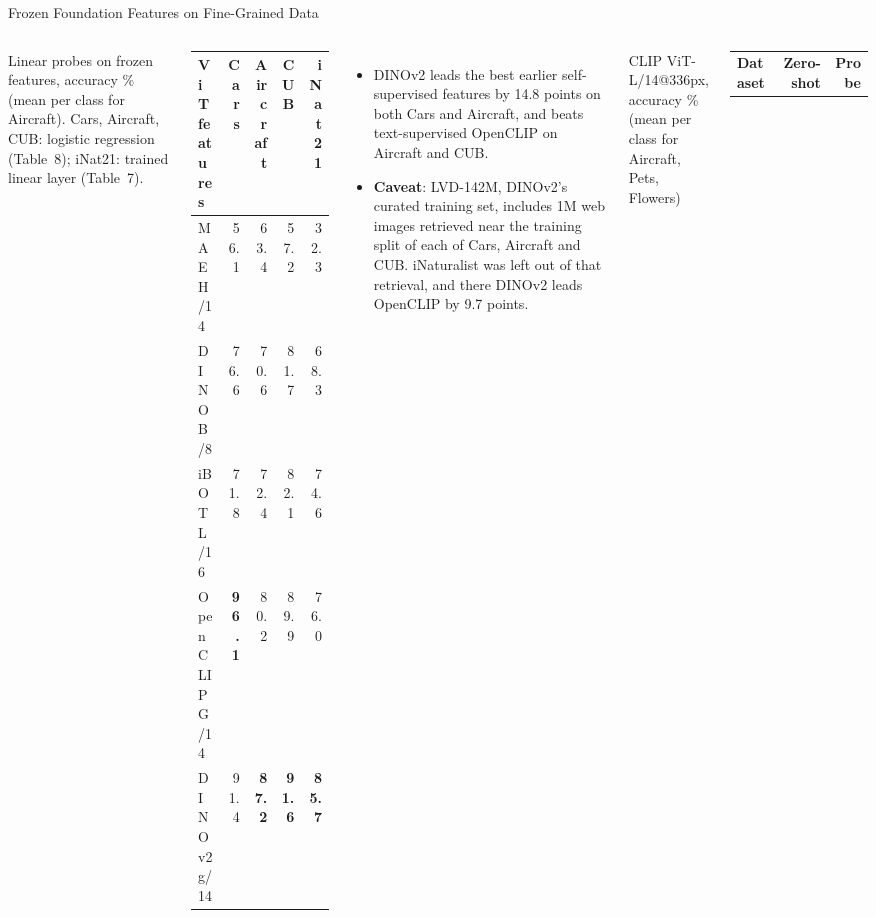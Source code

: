 \begin{frame}{Frozen Foundation Features on Fine-Grained Data}
  \begin{columns}[T,onlytextwidth]
      \centering
      {\scriptsize Linear probes on frozen features, accuracy \% (mean per class for Aircraft). Cars, Aircraft, CUB: logistic regression (Table~8); iNat21: trained linear layer (Table~7).\par}
      \vspace{0.2em}
      {\scriptsize\setlength{\tabcolsep}{4pt}
      \begin{tabular}{l r r r r}
        \toprule
        \textbf{ViT features} & \textbf{Cars} & \textbf{Aircraft} & \textbf{CUB} & \textbf{iNat21} \\
        \midrule
        MAE H/14 & 56.1 & 63.4 & 57.2 & 32.3 \\
        DINO B/8 & 76.6 & 70.6 & 81.7 & 68.3 \\
        iBOT L/16 & 71.8 & 72.4 & 82.1 & 74.6 \\
        OpenCLIP G/14 & \textbf{96.1} & 80.2 & 89.9 & 76.0 \\
        DINOv2 g/14 & 91.4 & \textbf{87.2} & \textbf{91.6} & \textbf{85.7} \\
        \bottomrule
      \end{tabular}\par}
      \vspace{0.3em}
      \begin{itemize}\scriptsize\itemsep0.25em
        \item DINOv2 leads the best earlier self-supervised features by 14.8 points on both Cars and Aircraft, and beats text-supervised OpenCLIP on Aircraft and CUB.
        \item \textbf{Caveat}: LVD-142M, DINOv2's curated training set, includes 1M web images retrieved near the training split of each of Cars, Aircraft and CUB. iNaturalist was left out of that retrieval, and there DINOv2 leads OpenCLIP by 9.7 points.
      \end{itemize}
      \centering
      {\scriptsize CLIP ViT-L/14@336px, accuracy \% (mean per class for Aircraft, Pets, Flowers)\par}
      \vspace{0.2em}
      {\scriptsize\setlength{\tabcolsep}{4pt}
      \begin{tabular}{l r r}
        \toprule
        \textbf{Dataset} & \textbf{Zero-shot} & \textbf{Probe} \\

\end{tabular}}
\end{columns}
\end{frame}
